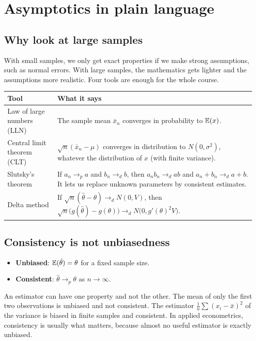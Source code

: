\chapter{Asymptotics in plain language}
\label{cap:assint}

\section{Why look at large samples}
With small samples, we only get exact properties if we make strong assumptions, such as normal errors. With large samples, the mathematics gets lighter and the assumptions more realistic. Four tools are enough for the whole course.

\begin{center}
\small
\begin{tabular}{p{3.6cm}p{10.2cm}}
\toprule
\textbf{Tool} & \textbf{What it says} \\
\midrule
Law of large numbers (LLN) & The sample mean $\bar x_n$ converges in probability to $\mathbb{E}(x)$. \\
Central limit theorem (CLT) & $\sqrt n(\bar x_n-\mu)$ converges in distribution to $N(0,\sigma^2)$, whatever the distribution of $x$ (with finite variance). \\
Slutsky's theorem & If $a_n\to_p a$ and $b_n\to_d b$, then $a_nb_n\to_d ab$ and $a_n+b_n\to_d a+b$. It lets us replace unknown parameters by consistent estimates. \\
Delta method & If $\sqrt n(\hat\theta-\theta)\to_d N(0,V)$, then $\sqrt n\big(g(\hat\theta)-g(\theta)\big)\to_d N\big(0,g'(\theta)^2V\big)$. \\
\bottomrule
\end{tabular}
\end{center}

\section{Consistency is not unbiasedness}
\begin{itemize}[leftmargin=1.4em]
\item \textbf{Unbiased}: $\mathbb{E}(\hat\theta)=\theta$ for a fixed sample size.
\item \textbf{Consistent}: $\hat\theta\to_p\theta$ as $n\to\infty$.
\end{itemize}
An estimator can have one property and not the other. The mean of only the first two observations is unbiased and not consistent. The estimator $\frac1n\sum(x_i-\bar x)^2$ of the variance is biased in finite samples and consistent. In applied econometrics, consistency is usually what matters, because almost no useful estimator is exactly unbiased.

